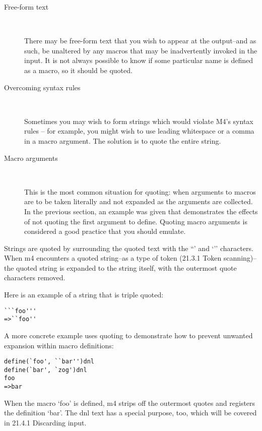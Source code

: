 \begin{description}
\item[Free-form text]
\

    There may be free-form text that you wish to appear at the output--and as such, be unaltered by any macros that may be inadvertently invoked in the input. It is not always possible to know if some particular name is defined as a macro, so it should be quoted.

\item[Overcoming syntax rules]
\

    Sometimes you may wish to form strings which would violate M4's syntax rules -- for example, you might wish to use leading whitespace or a comma in a macro argument. The solution is to quote the entire string.

\item[Macro arguments]
\

    This is the most common situation for quoting: when arguments to macros are to be taken literally and not expanded as the arguments are collected. In the previous section, an example was given that demonstrates the effects of not quoting the first argument to define. Quoting macro arguments is considered a good practice that you should emulate. 
\end{description}

Strings are quoted by surrounding the quoted text with the ``' and `'' characters. When m4 encounters a quoted string--as a type of token (21.3.1 Token scanning)--the quoted string is expanded to the string itself, with the outermost quote characters removed.

Here is an example of a string that is triple quoted:

 	
\begin{verbatim}
```foo'''
=>``foo''
\end{verbatim}

A more concrete example uses quoting to demonstrate how to prevent unwanted expansion within macro definitions:

 	

\begin{verbatim}
define(`foo', ``bar'')dnl
define(`bar', `zog')dnl
foo
=>bar
\end{verbatim}

When the macro `foo' is defined, m4 strips off the outermost quotes and registers the definition `bar'. The dnl text has a special purpose, too, which will be covered in 21.4.1 Discarding input.

